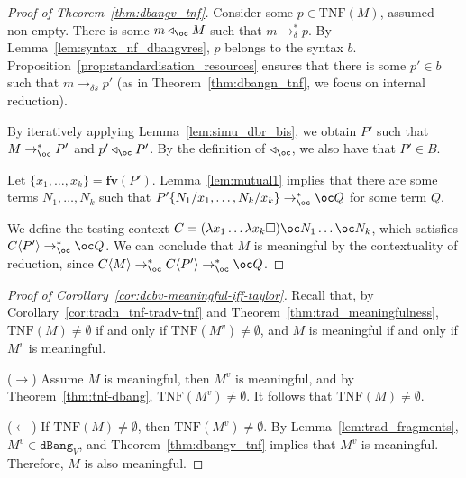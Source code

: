 \documentclass[10pt,a4paper]{article}
\newcommand{\<}{\langle}
\renewcommand{\>}{\rangle}
\newcommand{\fv}{\mathbf{fv}}
\newcommand{\dbang}{\ensuremath{\mathtt{dBang}}}
\newcommand{\dbangv}{\ensuremath{\dbang_V}}
\newcommand{\todbf}{\to_{\oc}} %
\newcommand{\todbrs}{\to_{\delta s}} %
\newcommand{\todbrf}{\to_{\delta}} %
\newcommand{\tradv}[1]{\ensuremath{{#1}^v}}
\newcommand{\app}{\triangleleft_\oc} %
\newcommand{\taylornf}[1]{\ensuremath{\text{TNF}(#1)}}
\newcommand{\nativeemdash}{\ifmmode\text{\textemdash}\else\textemdash\fi}
\begin{document}
\begin{proof}[Proof of Theorem~\ref{thm:dbangv_tnf}]
	Consider some
	$p\in\taylornf M$, assumed non-empty. There is some $m\app M$ such
	that $m\todbrf^*p$. By Lemma~\ref{lem:syntax_nf_dbangvres}, $p$ belongs to the syntax $b$.
	Proposition~\ref{prop:standardisation_resources} ensures that there is some $p'\in
	b$ such that $m\todbrs p'$ (as in Theorem~\ref{thm:dbangn_tnf}, we
	focus on internal reduction). 

	By iteratively applying Lemma~\ref{lem:simu_dbr_bis}, we obtain $P'$ such that
	$M\todbf^* P'$ and $p'\app P'$. By the definition of $\app$, we also
	have that $P'\in B$.

	Let $\{x_1,\dots ,x_k\}=\fv(P')$. Lemma~\ref{lem:mutual1} implies that there
	are some terms $N_1,\dots ,N_k$ such that $P'\{N_1/x_1,\dots ,N_k/x_k\}\todbf^* \oc
	Q$ for some term $Q$. 

	We define the testing context $C=(\lambda x_1\dots \lambda x_k \square)\oc
	N_1\dots \oc N_k$, which satisfies $C\<P'\>\todbf^*\oc Q$.
	We can conclude that $M$ is meaningful by the contextuality of reduction,
	since $C\<M\>\todbf^* C\<P'\>\todbf^* \oc Q$.
\end{proof}


\begin{proof}[Proof of Corollary~\ref{cor:dcbv-meaningful-iff-taylor}]
	Recall that, by Corollary~\ref{cor:tradn_tnf-tradv-tnf} and Theorem~\ref{thm:trad_meaningfulness}, 
	$\taylornf M\neq\emptyset$ if and
	only if $\taylornf {\tradv M}\neq\emptyset$, and $M$ is meaningful if
	and only if $\tradv M$ is meaningful.

	($\to$) Assume $M$ is meaningful, then $\tradv M$ is meaningful, and
	by Theorem~\ref{thm:tnf-dbang}, $\taylornf{\tradv M}\neq \emptyset$.
	It follows that $\taylornf M\neq\emptyset$.

	($\leftarrow$) If $\taylornf M\neq\emptyset$, then $\taylornf{\tradv
	M}\neq\emptyset$. By Lemma~\ref{lem:trad_fragments}, $\tradv
	M\in\dbangv$, and Theorem~\ref{thm:dbangv_tnf} implies that $\tradv M$
	is meaningful. Therefore, $M$ is also meaningful.
\end{proof}




\end{document}
